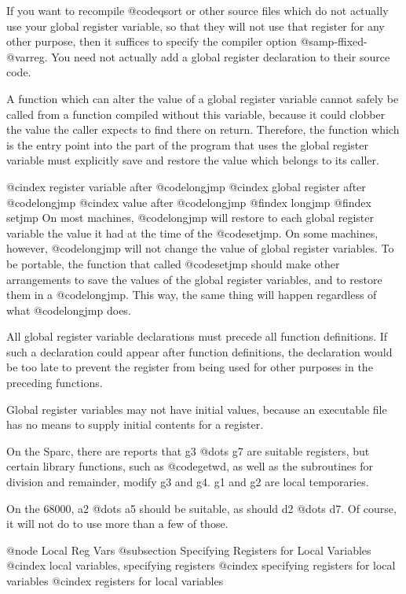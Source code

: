 {{{{If you want to recompile @code{qsort} or other source files which do not
actually use your global register variable, so that they will not use that
register for any other purpose, then it suffices to specify the compiler
option @samp{-ffixed-@var{reg}}.  You need not actually add a global
register declaration to their source code.

A function which can alter the value of a global register variable cannot
safely be called from a function compiled without this variable, because it
could clobber the value the caller expects to find there on return.
Therefore, the function which is the entry point into the part of the
program that uses the global register variable must explicitly save and
restore the value which belongs to its caller.

@cindex register variable after @code{longjmp}
@cindex global register after @code{longjmp}
@cindex value after @code{longjmp}
@findex longjmp
@findex setjmp
On most machines, @code{longjmp} will restore to each global register
variable the value it had at the time of the @code{setjmp}.  On some
machines, however, @code{longjmp} will not change the value of global
register variables.  To be portable, the function that called @code{setjmp}
should make other arrangements to save the values of the global register
variables, and to restore them in a @code{longjmp}.  This way, the same
thing will happen regardless of what @code{longjmp} does.

All global register variable declarations must precede all function
definitions.  If such a declaration could appear after function
definitions, the declaration would be too late to prevent the register from
being used for other purposes in the preceding functions.

Global register variables may not have initial values, because an
executable file has no means to supply initial contents for a register.

On the Sparc, there are reports that g3 @dots{} g7 are suitable
registers, but certain library functions, such as @code{getwd}, as well
as the subroutines for division and remainder, modify g3 and g4.  g1 and
g2 are local temporaries.

On the 68000, a2 @dots{} a5 should be suitable, as should d2 @dots{} d7.
Of course, it will not do to use more than a few of those.

@node Local Reg Vars
@subsection Specifying Registers for Local Variables
@cindex local variables, specifying registers 
@cindex specifying registers for local variables
@cindex registers for local variables

}}}}
